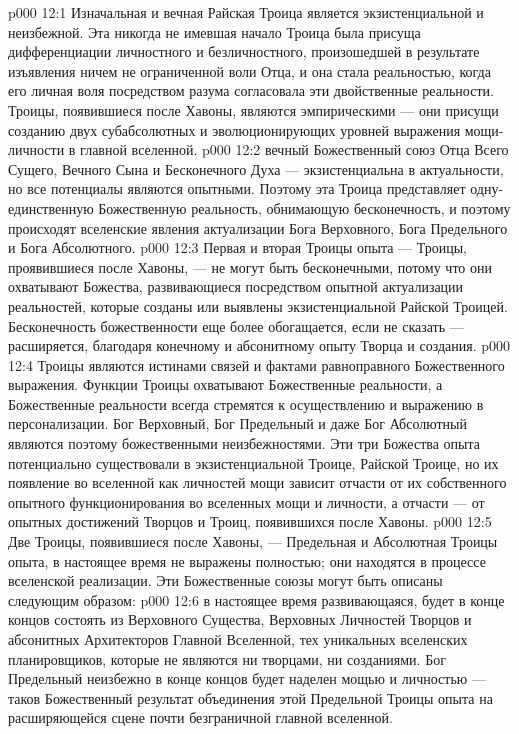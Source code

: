 \vs p000 12:1 Изначальная и вечная Райская Троица является экзистенциальной и неизбежной. Эта никогда не имевшая начало Троица была присуща дифференциации личностного и безличностного, произошедшей в результате изъявления ничем не ограниченной воли Отца, и она стала реальностью, когда его личная воля посредством разума согласовала эти двойственные реальности. Троицы, появившиеся после Хавоны, являются эмпирическими --- они присущи созданию двух субабсолютных и эволюционирующих уровней выражения мощи\hyp{}личности в главной вселенной.
\vs p000 12:2 \pc {} вечный Божественный союз Отца Всего Сущего, Вечного Сына и Бесконечного Духа --- экзистенциальна в актуальности, но все потенциалы являются опытными. Поэтому эта Троица представляет одну\hyp{}единственную Божественную реальность, обнимающую бесконечность, и поэтому происходят вселенские явления актуализации Бога Верховного, Бога Предельного и Бога Абсолютного.
\vs p000 12:3 \pc Первая и вторая Троицы опыта --- Троицы, проявившиеся после Хавоны, --- не могут быть бесконечными, потому что они охватывают  Божества, развивающиеся посредством опытной актуализации реальностей, которые созданы или выявлены экзистенциальной Райской Троицей. Бесконечность божественности еще более обогащается, если не сказать --- расширяется, благодаря конечному и абсонитному опыту Творца и создания.
\vs p000 12:4 Троицы являются истинами связей и фактами равноправного Божественного выражения. Функции Троицы охватывают Божественные реальности, а Божественные реальности всегда стремятся к осуществлению и выражению в персонализации. Бог Верховный, Бог Предельный и даже Бог Абсолютный являются поэтому божественными неизбежностями. Эти три Божества опыта потенциально существовали в экзистенциальной Троице, Райской Троице, но их появление во вселенной как личностей мощи зависит отчасти от их собственного опытного функционирования во вселенных мощи и личности, а отчасти --- от опытных достижений Творцов и Троиц, появившихся после Хавоны.
\vs p000 12:5 \pc Две Троицы, появившиеся после Хавоны, --- Предельная и Абсолютная Троицы опыта, в настоящее время не выражены полностью; они находятся в процессе вселенской реализации. Эти Божественные союзы могут быть описаны следующим образом:
\vs p000 12:6 \bibnobreakspace {} в настоящее время развивающаяся, будет в конце концов состоять из Верховного Существа, Верховных Личностей Творцов и абсонитных Архитекторов Главной Вселенной, тех уникальных вселенских планировщиков, которые не являются ни творцами, ни созданиями. Бог Предельный неизбежно в конце концов будет наделен мощью и личностью --- таков Божественный результат объединения этой Предельной Троицы опыта на расширяющейся сцене почти безграничной главной вселенной.

